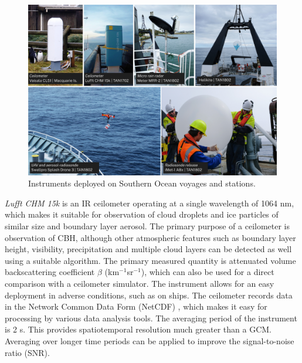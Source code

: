 \begin{figure}[t]
\centering
\centerline{\includegraphics[width=\textwidth]{fig/instruments.jpg}}
\caption[Instruments deployed on Southern Ocean voyages and stations]{
Instruments deployed on Southern Ocean voyages and stations.
}
\label{fig:1:instruments}
\end{figure}

\textit{Lufft CHM 15k} is an IR ceilometer operating at a single wavelength of
1064 nm, which makes it suitable for observation of cloud droplets and
ice particles of similar size and boundary layer aerosol.
The primary purpose of a ceilometer
is observation of CBH, although other atmospheric features
such as boundary layer height, visibility, precipitation and multiple
cloud layers can be detected as well using a suitable algorithm. The
primary measured quantity is attenuated volume backscattering coefficient
$\beta$ (km$^{-1}$sr$^{-1}$), which
can also be used for a direct comparison with a ceilometer simulator.
The instrument allows for an easy deployment
in adverse conditions, such as on ships.
The ceilometer records data in the Network Common Data Form (NetCDF) \citep{rew2006},
which makes it easy
for processing by various data analysis tools.
The averaging period of the instrument is 2 s. This provides spatiotemporal
resolution much greater than a GCM. Averaging over longer time periods can be applied to improve the signal-to-noise ratio (SNR).

